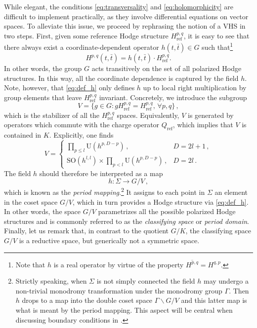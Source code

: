 \documentclass[11pt,a4paper]{article}
\numberwithin{equation}{section}
\numberwithin{table}{section}\setlength{\multlinegap}{25pt}
\begin{document}
While elegant, the conditions \eqref{eq:transversality} and \eqref{eq:holomorphicity} are difficult to implement practically, as they involve differential equations on vector spaces. To alleviate this issue, we proceed by rephrasing the notion of a VHS in two steps. First, given some reference Hodge structure $H^{p,q}_{\mathrm{ref}}$, it is easy to see that there always exist a coordinate-dependent operator $h(t,\bar{t})\in G$ such that\footnote{Note that $h$ is a real operator by virtue of the property $\overline{H^{p,q}}=H^{q,p}$.}
\begin{equation}
\label{eq:def_h}	H^{p,q}(t,\bar{t}) = h(t,\bar{t})\cdot H^{p,q}_{\mathrm{ref}}.
\end{equation}
In other words, the group $G$ acts transitively on the set of all polarized Hodge structures. In this way, all the coordinate dependence is captured by the field $h$. Note, however, that \eqref{eq:def_h} only defines $h$ up to local right multiplication by group elements that leave $H^{p,q}_{\mathrm{ref}}$ invariant. Concretely, we introduce the subgroup
\begin{equation}
	V = \{g\in G: g H^{p,q}_{\mathrm{ref}} = H^{p,q}_{\mathrm{ref}},\,\forall p,q\}\,,
\end{equation}
which is the stabilizer of all the $H^{p,q}_{\mathrm{ref}}$ spaces. Equivalently, $V$ is generated by operators which commute with the charge operator $Q_{\mathrm{ref}}$, which implies that $V$ is contained in $K$. Explicitly, one finds
\begin{equation}
	V = \begin{cases}
		\prod_{p\leq l} \mathrm{U}(h^{p,D-p})\,, & D=2l+1\,,\\
		\mathrm{SO}(h^{l,l})\times \prod_{p<l} \mathrm{U}(h^{p,D-p})\,,  & D=2l\,.
	\end{cases}
\end{equation}
The field $h$ should therefore be interpreted as a map 
\begin{equation}
	h: \Sigma\rightarrow G/V\,,
\end{equation}
which is known as the \textit{period mapping}.\footnote{Strictly speaking, when $\Sigma$ is not simply connected the field $h$ may undergo a non-trivial monodromy transformation under the monodromy group $\Gamma$. Then $h$ drops to a map into the double coset space $\Gamma\backslash G/V$ and this latter map is what is meant by the period mapping. This aspect will be central when discussing 
boundary conditions in \cite{Grimm_WZW_II}.} It assigns to each point in $\Sigma$ an element in the coset space $G/V$, which in turn provides a Hodge structure via \eqref{eq:def_h}. In other words, the space $G/V$ parametrizes all the possible polarized Hodge structures and is commonly referred to as the \textit{classifying space} or \textit{period domain}. Finally, let us remark that, in contrast to the quotient $G/K$, the classifying space $G/V$ is a reductive space, but generically not a symmetric space.
\end{document}
